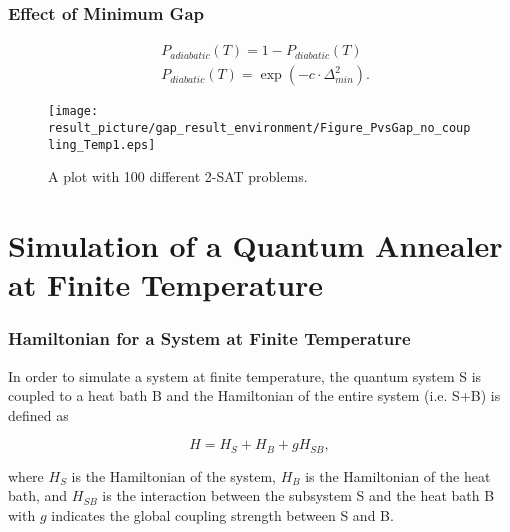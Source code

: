 \documentclass{beamer}
\begin{document}
\begin{frame}
	\frametitle{Effect of Minimum Gap}
		\begin{equation*}
		\begin{split}
		&P_{adiabatic}(T) = 1-P_{diabatic}(T)\\
		&P_{diabatic}(T) = \exp(-c\cdot \Delta_{min}^2).
		\end{split}
		\end{equation*}
	\begin{figure}
		\centering
		\texttt{[image: result\_picture/gap\_result\_environment/Figure\_PvsGap\_no\_coupling\_Temp1.eps]}
		
		 \caption{A plot with 100 different 2-SAT problems.}
	\end{figure}
\end{frame}




\section{Simulation of a Quantum Annealer at Finite Temperature}

\begin{frame}
	\frametitle{Hamiltonian for a System at Finite Temperature}
	In order to simulate a system at finite temperature, the quantum system S is coupled to a heat bath B and the Hamiltonian of the entire system (i.e. S+B) is defined as
	
	\begin{equation*}
	H = H_S + H_B + gH_{SB},
	\end{equation*} 
	
	where $H_S$ is the Hamiltonian of the system, $H_B$ is the Hamiltonian of the heat bath, and $H_{SB}$ is the interaction between the subsystem S and the heat bath B with $g$ indicates the global coupling strength between S and B. 
\end{frame}
\end{document}
